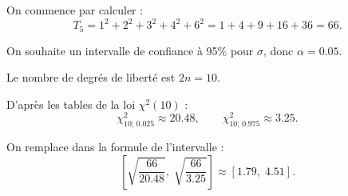 \documentclass[a4paper,11pt]{article}
\begin{document}
On commence par calculer :
\[
T_5 = 1^2 + 2^2 + 3^2 + 4^2 + 6^2 = 1 + 4 + 9 + 16 + 36 = 66.
\]

On souhaite un intervalle de confiance à 95\% pour $\sigma$, donc $\alpha = 0.05$.

Le nombre de degrés de liberté est $2n = 10$.

D’après les tables de la loi $\chi^2(10)$ :
\[
\chi^2_{10;\,0.025} \approx 20.48, \qquad \chi^2_{10;\,0.975} \approx 3.25.
\]

On remplace dans la formule de l’intervalle :
\[
\left[ \sqrt{ \frac{66}{20.48} },\; \sqrt{ \frac{66}{3.25} } \right] \approx [1.79,\; 4.51].
\]

\end{document}
